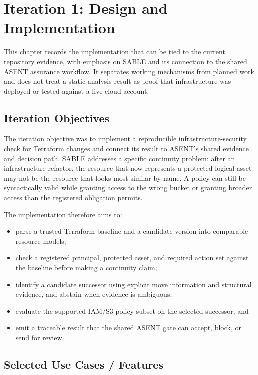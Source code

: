 \chapter{Iteration 1: Design and Implementation}

This chapter records the implementation that can be tied to the current repository evidence, with emphasis on SABLE and its connection to the shared ASENT assurance workflow. It separates working mechanisms from planned work and does not treat a static analysis result as proof that infrastructure was deployed or tested against a live cloud account.

\section{Iteration Objectives}

The iteration objective was to implement a reproducible infrastructure-security check for Terraform changes and connect its result to ASENT's shared evidence and decision path. SABLE addresses a specific continuity problem: after an infrastructure refactor, the resource that now represents a protected logical asset may not be the resource that looks most similar by name. A policy can still be syntactically valid while granting access to the wrong bucket or granting broader access than the registered obligation permits.

The implementation therefore aims to:
\begin{itemize}
    \item parse a trusted Terraform baseline and a candidate version into comparable resource models;
    \item check a registered principal, protected asset, and required action set against the baseline before making a continuity claim;
    \item identify a candidate successor using explicit move information and structural evidence, and abstain when evidence is ambiguous;
    \item evaluate the supported IAM/S3 policy subset on the selected successor; and
    \item emit a traceable result that the shared ASENT gate can accept, block, or send for review.
\end{itemize}

\section{Selected Use Cases / Features}

